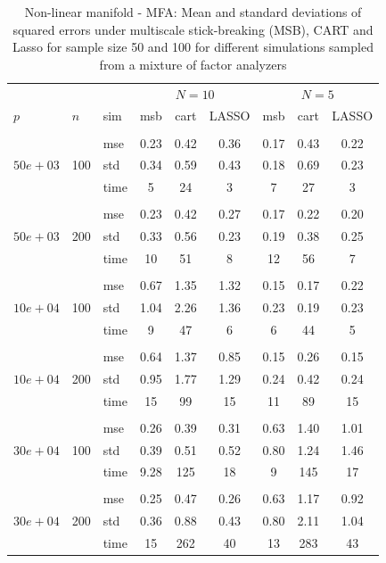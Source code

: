 \begin{table}[t]
\caption{Non-linear manifold - MFA: Mean and standard deviations of squared errors under multiscale stick-breaking (MSB), CART and Lasso for sample size 50 and 100 for different simulations sampled from a mixture of factor analyzers}\label{table:mfa}
\vskip 0.15in
\begin{center}
\begin{small}
\begin{sc}
\begin{tabular}{lllcccccc}
\hline
&&&\multicolumn{3}{c}{$N=10$}&\multicolumn{3}{c}{$N=5$}\\
$p$&$n$& sim& msb&cart&LASSO & msb&cart&LASSO\\
\\
\multirow{3}{*}{$50e+03$}&\multirow{3}{*}{100}&mse&0.23&0.42&0.36&0.17&0.43&0.22\\
&&std & 0.34 &0.59&0.43&0.18&0.69&0.23\\
&&time &5&24 & 3&7&27&3\\

\\
\multirow{3}{*}{$50e+03$}&\multirow{3}{*}{200}&mse&0.23 &0.42 &0.27&0.17&0.22&0.20\\
&&std & 0.33& 0.56&0.23&0.19&0.38&0.25\\
&&time & 10 &51&8&12&56&7\\

\\
\multirow{3}{*}{$10e+04$}&\multirow{3}{*}{100}&mse&0.67&1.35&1.32&0.15&0.17&0.22\\
&&std & 1.04&2.26&1.36&0.23&0.19&0.23\\
&&time &9&47&6&6&44&5\\

\\
\multirow{3}{*}{$10e+04$}&\multirow{3}{*}{200}&mse&0.64&1.37&0.85&0.15&0.26&0.15\\
&&std &0.95 &1.77&1.29&0.24&0.42&0.24\\
&&time &15&99&15&11&89&15\\
\\
\multirow{3}{*}{$30e+04$}&\multirow{3}{*}{100}&mse& 0.26&0.39&0.31&0.63&1.40&1.01\\
&&std &0.39&0.51&0.52&0.80 &1.24& 1.46 \\
&&time &9.28&125&18&9 &145& 17\\
\\
\multirow{3}{*}{$30e+04$}&\multirow{3}{*}{200}&mse&0.25&0.47&0.26&0.63&1.17&0.92\\
&&std &0.36&0.88&0.43 & 0.80&2.11&1.04 \\
&&time &15&262&40&13&283&43\\



\end{tabular}
\end{sc}
\end{small}
\end{center}
\end{table}
